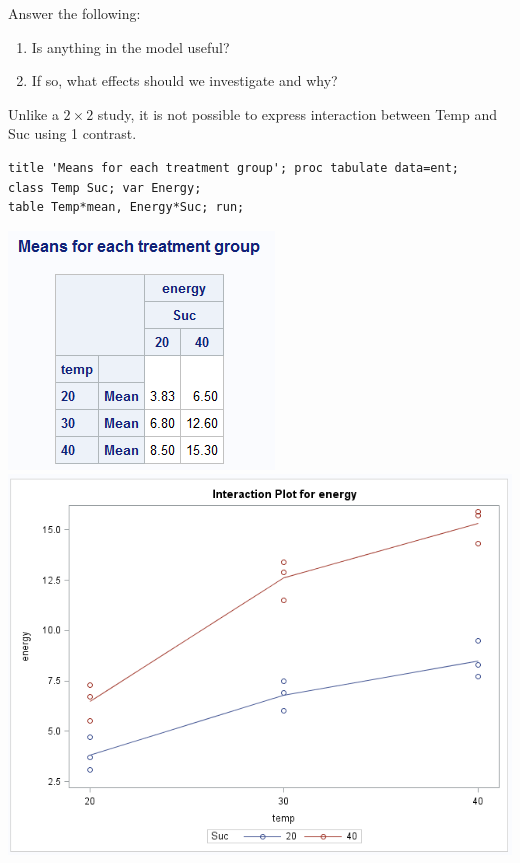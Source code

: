 Answer the following:
\begin{enumerate}
\item Is anything in the model useful?
\item If so, what effects should we investigate and why?
\end{enumerate}

\newpage
Unlike a $2\times2$ study, it is not possible to express interaction between Temp and Suc using 1 contrast.

\begin{small}
\begin{verbatim}
title 'Means for each treatment group'; proc tabulate data=ent;
class Temp Suc; var Energy;
table Temp*mean, Energy*Suc; run;
\end{verbatim}
\end{small}

\begin{center}
\includegraphics[scale=0.9]{EntMeans}\includegraphics[scale=0.6]{Ent2}
\end{center}

